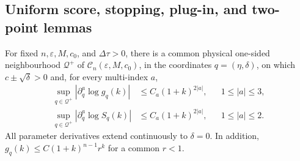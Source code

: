 \subsection{Uniform score, stopping, plug-in, and two-point lemmas}
\label{subsec:singular-uniform-lemmas-main}

\begin{lemma}
\label{lem:uniform-sampled-bin-tail-score-main}
For fixed \(n,\varepsilon,M,c_0\), and \(\Delta\tau>0\), there is a common
physical one-sided neighbourhood \(\mathcal Q^+\) of
\(\mathcal C_n(\varepsilon,M,c_0)\), in the coordinates
\(q=(\eta,\delta)\), on which \(c\pm\sqrt\delta>0\) and, for every
multi-index \(a\),
\[
\begin{aligned}
 \sup_{q\in\mathcal Q^+}|\partial_q^a\log g_q(k)|
 &\le C_a(1+k)^{2|a|},&& 1\le|a|\le3,\\
 \sup_{q\in\mathcal Q^+}|\partial_q^a\log S_q(k)|
 &\le C_a(1+k)^{2|a|},&& 1\le|a|\le2.
\end{aligned}
\tag{U1}
\]
All parameter derivatives extend continuously to \(\delta=0\).  In addition,
\(g_q(k)\le C(1+k)^{n-1}r^k\) for a common \(r<1\).
\end{lemma}

